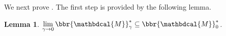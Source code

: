 \documentclass{article}
\theoremstyle{plain}
\newtheorem{lemma}[theorem]{Lemma}
\theoremstyle{definition}
\theoremstyle{remark}
\newcommand{\dg}[1]{\mathbdcal{#1}}
\newcommand\Inc{\mathit{Inc}}
\numberwithin{equation}{section}
\begin{document}
%
We next prove .  The first step is provided by the
following lemma.
\begin{lemma}\label{lem:gamma2zero}
 $\lim\limits_{\gamma\to0}\bbr{\dg M}_\gamma^* \subseteq \bbr{\dg M}_0^*$. 
\end{lemma}
\end{document}
